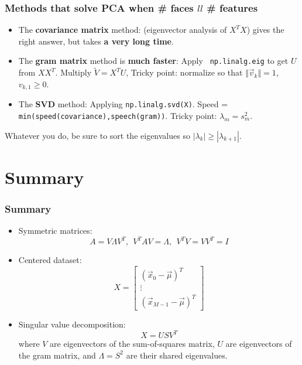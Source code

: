 \documentclass{beamer}
\begin{document}
\begin{frame}
  \frametitle{Methods that solve PCA when \# faces $ll$ \# features}
  \begin{itemize}
  \item The {\bf covariance matrix} method: (eigenvector analysis of
    $X^TX$) gives the right answer, but takes {\bf a very long time}.
  \item The {\bf gram matrix} method is {\bf much faster}: Apply {\tt
    np.linalg.eig} to get $U$ from $XX^T$. Multiply $\tilde{V}=X^TU$,
    Tricky point: normalize so that $\Vert\vec{v}_k\Vert=1$,
    $v_{k,1}\ge 0$.
  \item The {\bf SVD} method: Applying {\tt np.linalg.svd(X)}.  Speed
    = {\tt min(speed(covariance),speech(gram))}.  Tricky point:
    $\lambda_m=s_m^2$.
  \end{itemize}
  Whatever you do, be sure to sort the eigenvalues so
  $|\lambda_k|\ge|\lambda_{k+1}|$.
\end{frame}

\section[Summary]{Summary}
\setcounter{subsection}{1}

\begin{frame}
  \frametitle{Summary}
  \begin{itemize}
  \item Symmetric matrices:
    \[
    A=V\Lambda V^T,~~V^TAV=\Lambda,~~V^TV=VV^T=I
    \]
  \item Centered dataset:
    \[
    X = \left[\begin{array}{c}(\vec{x}_0-\vec\mu)^T\\\vdots\\(\vec{x}_{M-1}-\vec\mu)^T\end{array}\right]
    \]
  \item Singular value decomposition:
    \[
    X = USV^T
    \]
    where $V$ are eigenvectors of the sum-of-squares matrix, $U$ are
    eigenvectors of the gram matrix, and $\Lambda=S^2$ are their
    shared eigenvalues.
  \end{itemize}
\end{frame}
\end{document}
